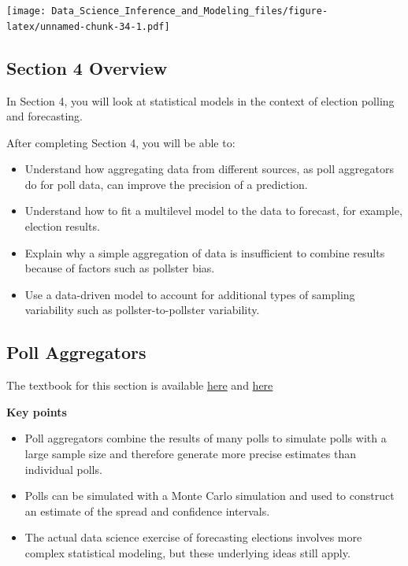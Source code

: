 \documentclass[
]{article}
\providecommand{\tightlist}{%
  \setlength{\itemsep}{0pt}\setlength{\parskip}{0pt}}
\begin{document}
\texttt{[image: Data\_Science\_Inference\_and\_Modeling\_files/figure-latex/unnamed-chunk-34-1.pdf]}

\hypertarget{section-4-overview}{%
\subsection{Section 4 Overview}\label{section-4-overview}}

In Section 4, you will look at statistical models in the context of
election polling and forecasting.

After completing Section 4, you will be able to:

\begin{itemize}
\tightlist
\item
  Understand how aggregating data from different sources, as poll
  aggregators do for poll data, can improve the precision of a
  prediction.
\item
  Understand how to fit a multilevel model to the data to forecast, for
  example, election results.
\item
  Explain why a simple aggregation of data is insufficient to combine
  results because of factors such as pollster bias.
\item
  Use a data-driven model to account for additional types of sampling
  variability such as pollster-to-pollster variability.
\end{itemize}

\hypertarget{poll-aggregators}{%
\subsection{Poll Aggregators}\label{poll-aggregators}}

The textbook for this section is available
\href{https://rafalab.github.io/dsbook/models.html}{here} and
\href{https://rafalab.github.io/dsbook/models.html\#poll-aggregators}{here}

\textbf{Key points}

\begin{itemize}
\tightlist
\item
  Poll aggregators combine the results of many polls to simulate polls
  with a large sample size and therefore generate more precise estimates
  than individual polls.
\item
  Polls can be simulated with a Monte Carlo simulation and used to
  construct an estimate of the spread and confidence intervals.
\item
  The actual data science exercise of forecasting elections involves
  more complex statistical modeling, but these underlying ideas still
  apply.
\end{itemize}
\end{document}

